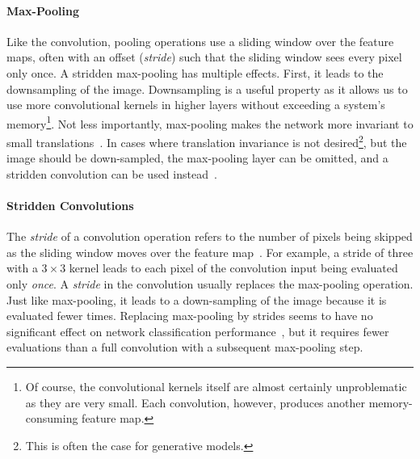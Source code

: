 \paragraph{Max-Pooling}
Like the convolution, pooling operations use a sliding window over the feature maps, often with an offset (\textit{stride}) such that the sliding window sees every pixel only once.
A stridden max-pooling has multiple effects.
First, it leads to the downsampling of the image.
Downsampling is a useful property as it allows us to use more convolutional kernels in higher layers without exceeding a system's memory\footnote{Of course, the convolutional kernels itself are almost certainly unproblematic as they are very small. Each convolution, however, produces another memory-consuming feature map.}.
Not less importantly, max-pooling makes the network more invariant to small translations~\citep[p. 342]{Goodfellow-et-al-2016}.
In cases where translation invariance is not desired\footnote{This is often the case for generative models.}, but the image should be down-sampled, the max-pooling layer can be omitted, and a stridden convolution can be used instead~\citep[p. 337]{Goodfellow-et-al-2016}.

\paragraph{Stridden Convolutions}
The \textit{stride} of a convolution operation refers to the number of pixels being skipped as the sliding window moves over the feature map~\citep[p. 348]{Goodfellow-et-al-2016}.
For example, a stride of three with a $3\times 3$ kernel leads to each pixel of the convolution input being evaluated only \textit{once}.
A \textit{stride} in the convolution usually replaces the max-pooling operation.
Just like max-pooling, it leads to a down-sampling of the image because it is evaluated fewer times.
Replacing max-pooling by strides seems to have no significant effect on network classification performance~\citep{springenberg2015striving}, but it requires fewer evaluations than a full convolution with a subsequent max-pooling step.

